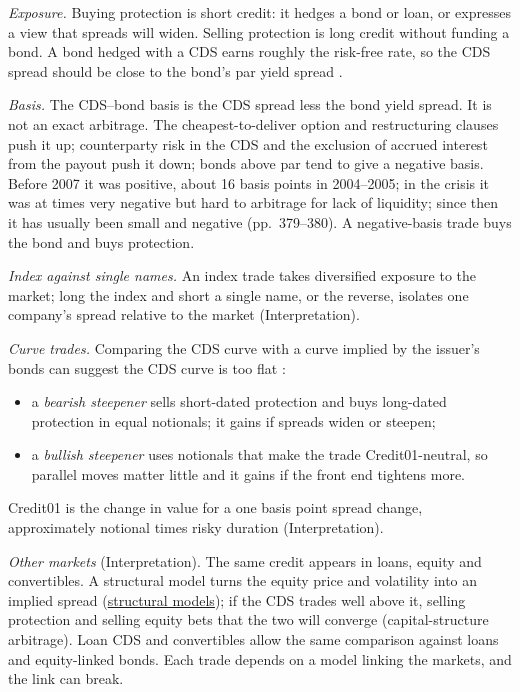 \begin{qfmethod}\label{meth:cds-strategies}
 \emph{Exposure.} Buying protection is short credit: it hedges a bond or loan, or expresses a view that spreads will widen. Selling protection is long credit without funding a bond. A bond hedged with a CDS earns roughly the risk-free rate, so the CDS spread should be close to the bond's par yield spread \citep[p.~378]{risk-management-financial-institutions-2023}.

\emph{Basis.} The CDS--bond basis is the CDS spread less the bond yield spread. It is not an exact arbitrage. The cheapest-to-deliver option and restructuring clauses push it up; counterparty risk in the CDS and the exclusion of accrued interest from the payout push it down; bonds above par tend to give a negative basis. Before 2007 it was positive, about 16 basis points in 2004--2005; in the crisis it was at times very negative but hard to arbitrage for lack of liquidity; since then it has usually been small and negative (pp.~379--380). A negative-basis trade buys the bond and buys protection.

\emph{Index against single names.} An index trade takes diversified exposure to the market; long the index and short a single name, or the reverse, isolates one company's spread relative to the market (Interpretation).

\emph{Curve trades.} Comparing the CDS curve with a curve implied by the issuer's bonds can suggest the CDS curve is too flat \citep[p.~13]{berd-mashal-wang-2004}:
\begin{itemize}
\item a \emph{bearish steepener} sells short-dated protection and buys long-dated protection in equal notionals; it gains if spreads widen or steepen;
\item a \emph{bullish steepener} uses notionals that make the trade Credit01-neutral, so parallel moves matter little and it gains if the front end tightens more.
\end{itemize}
Credit01 is the change in value for a one basis point spread change, approximately notional times risky duration (Interpretation).

\emph{Other markets} (Interpretation). The same credit appears in loans, equity and convertibles. A structural model turns the equity price and volatility into an implied spread (\hyperref[mod:structural-reduced-form-credit]{structural models}); if the CDS trades well above it, selling protection and selling equity bets that the two will converge (capital-structure arbitrage). Loan CDS and convertibles allow the same comparison against loans and equity-linked bonds. Each trade depends on a model linking the markets, and the link can break.


\end{qfmethod}
